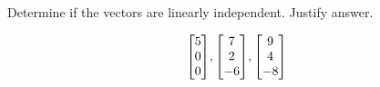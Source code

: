 \documentclass{../mathhomework}
\newenvironment{Mat}{\begin{bmatrix}}{\end{bmatrix}}
\begin{document}
\begin{problem}[1.7\#1]
    Determine if the vectors are linearly independent. Justify answer.
    
    \begin{equation*}
        \begin{Mat}
            5 \\ 0 \\ 0
        \end{Mat},
        \begin{Mat}
            7 \\ 2 \\ -6
        \end{Mat},
        \begin{Mat}
            9 \\ 4 \\ -8
        \end{Mat}
    \end{equation*}


\end{problem}
\end{document}
